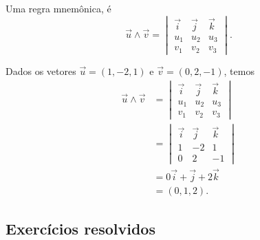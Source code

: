 \begin{obs}
  Uma regra mnemônica, é
  \begin{equation}
    \vec{u}\land\vec{v} =
    \begin{vmatrix}
      \vec{i} & \vec{j} & \vec{k} \\
      u_1 & u_2 & u_3 \\
      v_1 & v_2 & v_3
    \end{vmatrix}.
  \end{equation}
\end{obs}

\begin{ex}
  Dados os vetores $\vec{u} = (1,-2,1)$ e $\vec{v} = (0,2,-1)$, temos
  \begin{align}
    \vec{u}\land\vec{v} &=
                          \begin{vmatrix}
                            \vec{i} & \vec{j} & \vec{k} \\
                            u_1 & u_2 & u_3 \\
                            v_1 & v_2 & v_3
                          \end{vmatrix} \\
                        &=
                          \begin{vmatrix}
                            \vec{i} & \vec{j} & \vec{k} \\
                            1       & -2      & 1 \\
                            0       & 2       & -1
                          \end{vmatrix} \\
                        &= 0\vec{i} + \vec{j} + 2\vec{k}\\
                        &= (0,1,2).
  \end{align}
\end{ex}

\subsection*{Exercícios resolvidos}

